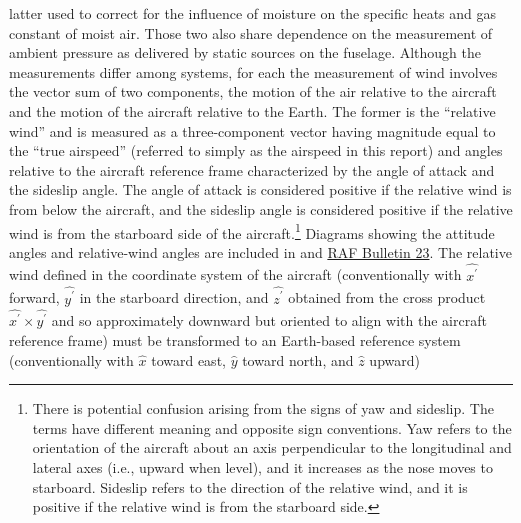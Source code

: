 \documentclass[12pt,twoside,english]{article}\usepackage[]{graphicx}\usepackage[]{color}
\let\OrgIndex\index
\renewcommand*{\index}[1]{\OrgIndex{#1}}
\providecommand{\DIFaddbegin}{} %
\providecommand{\DIFaddend}{} %
\providecommand{\DIFdelbegin}{} %
\providecommand{\DIFdelend}{} %
\begin{document}
latter used to correct for the influence of moisture on the specific heats and gas constant of moist air. Those two also share dependence on the measurement of ambient pressure as delivered by static sources on the fuselage. Although the measurements differ among systems, for each the measurement of wind involves the vector sum of two components, the motion of the air relative to the aircraft and the motion of the aircraft relative to the Earth. The former is the ``relative wind'' and is measured as a three-component vector having magnitude equal to the ``true airspeed'' (referred to simply as the airspeed in this report) and angles relative to the aircraft reference frame characterized by the angle of attack and the sideslip angle. The angle of attack is considered positive if the relative wind is from below the aircraft, and the sideslip angle is considered positive if the relative wind is from the starboard side of the aircraft.\footnote{There is potential confusion arising from the signs of yaw and sideslip. The terms have different meaning and opposite sign conventions. Yaw refers to the orientation of the aircraft about an axis perpendicular to the longitudinal and lateral axes (i.e., upward when level), and it increases as the nose moves to starboard. Sideslip refers to the direction of the relative wind, and it is positive if the relative wind is from the starboard side.} Diagrams showing the attitude angles and relative-wind angles are included in \citet{NCAR_OpenSky_TECH-NOTE-000-000-000-064} and \href{https://www.eol.ucar.edu/raf/Bulletins/bulletin23.html}{RAF Bulletin 23}. The relative wind defined in the coordinate system of the aircraft (conventionally with $\hat{x^{\prime}}$ forward, $\hat{y^{\prime}}$ in the starboard direction, and $\hat{z^{\prime}}$ \DIFdelbegin %
\DIFdelend \DIFaddbegin {}\DIFaddend obtained from the cross product $\hat{x^{\prime}}\times\hat{y^{\prime}}$ and so approximately downward but oriented to align with the aircraft reference frame) must be transformed to an Earth-based reference system (conventionally with $\hat{x}$ toward east, $\hat{y}$ toward north, and $\hat{z}$ upward) \DIFdelbegin %
\end{document}
